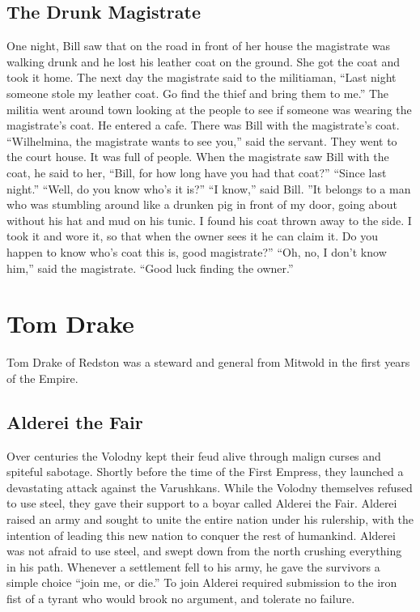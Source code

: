 \documentclass[twoside,11pt,b5paper,twocolumn]{scrbook}
\begin{document}
\subsection{The Drunk Magistrate}
One night, Bill saw that on the road in front of her house the magistrate was walking drunk and he lost his leather coat on the ground. She got the coat and took it home.
The next day the magistrate said to the militiaman, “Last night someone stole my leather coat. Go find the thief and bring them to me.”
The militia went around town looking at the people to see if someone was wearing the magistrate's coat. He entered a cafe. There was Bill with the magistrate's coat.
“Wilhelmina, the magistrate wants to see you,” said the servant.
They went to the court house. It was full of people.
When the magistrate saw Bill with the coat, he said to her, “Bill, for how long have you had that coat?”
“Since last night.”
“Well, do you know who's it is?”
“I know,” said Bill. ”It belongs to a man who was stumbling around like a drunken pig in front of my door, going about without his hat and mud on his tunic. I found his coat thrown away to the side. I took it and wore it, so that when the owner sees it he can claim it. Do you happen to know who's coat this is, good magistrate?”
“Oh, no, I don't know him,” said the magistrate. “Good luck finding the owner.” 
\section{Tom Drake}
Tom Drake of Redston was a steward and general from Mitwold in the first years of the Empire.
\subsection{Alderei the Fair}
Over centuries the Volodny kept their feud alive through malign curses and spiteful sabotage. Shortly before the time of the First Empress, they launched a devastating attack against the Varushkans. While the Volodny themselves refused to use steel, they gave their support to a boyar called Alderei the Fair. Alderei raised an army and sought to unite the entire nation under his rulership, with the intention of leading this new nation to conquer the rest of humankind. Alderei was not afraid to use steel, and swept down from the north crushing everything in his path. Whenever a settlement fell to his army, he gave the survivors a simple choice “join me, or die.” To join Alderei required submission to the iron fist of a tyrant who would brook no argument, and tolerate no failure.
\end{document}
